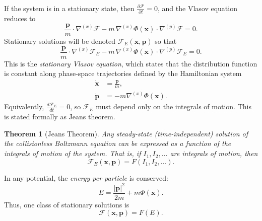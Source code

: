 \documentclass[12pt,a4paper]{article}
\newtheorem{thm}{Theorem}[section]
\numberwithin{equation}{section}
\begin{document}
If the system is in a stationary state, then $\frac{\partial \mathcal{F}}{\partial t} = 0$, and the Vlasov equation reduces to
\begin{equation}
\frac{\bm{p}}{m} \cdot \nabla^{(x)} \mathcal{F} - m \, \nabla^{(x)} \Phi(\mathbf{x}) \cdot \nabla^{(p)} \mathcal{F} = 0.
\end{equation}
Stationary solutions will be denoted $\mathcal{F}_{E}(\mathbf{x},\mathbf{p})$ so that
\begin{equation}
\frac{\bm{p}}{m} \cdot \nabla^{(x)} \mathcal{F}_{E} - m \, \nabla^{(x)} \Phi(\mathbf{x}) \cdot \nabla^{(p)} \mathcal{F}_{E} = 0.
\end{equation}
This is the \emph{stationary Vlasov equation}, which states that the distribution function is constant along phase-space trajectories defined by the Hamiltonian system
\begin{align}
\dot{\mathbf{x}} &= \frac{\bm{p}}{m}, \\
\dot{\bm{p}} &= - m \nabla^{(x)} \Phi(\mathbf{x}).
\end{align}
Equivalently, $\frac{d\mathcal{F}_{E}}{dt} = 0$, so $\mathcal{F}_{E}$ must depend only on the integrals of motion. This is stated formally as Jeans theorem.

\begin{thm}[Jeans Theorem]
Any steady-state (time-independent) solution of the collisionless Boltzmann equation can be expressed as a function of the integrals of motion of the system. That is, if $I_1, I_2, \dots$ are integrals of motion, then
\begin{equation}
\mathcal{F}_{E}(\mathbf{x},\bm{p}) = F(I_1, I_2, \dots).
\end{equation}
\end{thm}

In any potential, the \emph{energy per particle} is conserved:
\begin{equation}
E = \frac{|\bm{p}|^2}{2m} + m \Phi(\mathbf{x}).
\end{equation}
Thus, one class of stationary solutions is
\begin{equation}
\mathcal{F}(\mathbf{x},\bm{p}) = F(E).
\end{equation}
\end{document}
